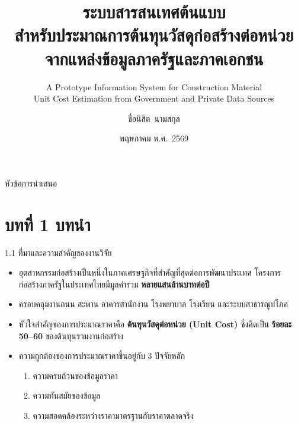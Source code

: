 \documentclass[aspectratio=169,11pt]{beamer}
\title[ระบบประมาณการต้นทุนวัสดุก่อสร้าง]{ระบบสารสนเทศต้นแบบ\\
สำหรับประมาณการต้นทุนวัสดุก่อสร้างต่อหน่วย\\
จากแหล่งข้อมูลภาครัฐและภาคเอกชน}
\subtitle{A Prototype Information System for Construction Material\\
Unit Cost Estimation from Government and Private Data Sources}
\author[ชื่อนิสิต]{ชื่อนิสิต~นามสกุล}
\institute[ภาควิชาวิศวกรรมโยธา จุฬาฯ]{ภาควิชาวิศวกรรมโยธา\\คณะวิศวกรรมศาสตร์ จุฬาลงกรณ์มหาวิทยาลัย}
\date{พฤษภาคม พ.ศ.~2569}
\begin{document}
{
\begin{frame}[plain]
  \titlepage
\end{frame}
}

\begin{frame}[shrink=10]{หัวข้อการนำเสนอ}
  \tableofcontents
\end{frame}

\section{บทที่ 1 บทนำ}

\begin{frame}{1.1 ที่มาและความสำคัญของงานวิจัย}
  \begin{itemize}
    \item อุตสาหกรรมก่อสร้างเป็นหนึ่งในภาคเศรษฐกิจที่สำคัญที่สุดต่อการพัฒนาประเทศ
          โครงการก่อสร้างภาครัฐในประเทศไทยมีมูลค่ารวม \textbf{หลายแสนล้านบาทต่อปี}
    \item ครอบคลุมงานถนน สะพาน อาคารสำนักงาน โรงพยาบาล โรงเรียน และระบบสาธารณูปโภค
    \item หัวใจสำคัญของการประมาณราคาคือ \textbf{ต้นทุนวัสดุต่อหน่วย (Unit Cost)}
          ซึ่งคิดเป็น \textbf{ร้อยละ 50--60} ของต้นทุนรวมงานก่อสร้าง
    \item ความถูกต้องของการประมาณราคาขึ้นอยู่กับ 3 ปัจจัยหลัก
          \begin{enumerate}
            \item ความครบถ้วนของข้อมูลราคา
            \item ความทันสมัยของข้อมูล
            \item ความสอดคล้องระหว่างราคามาตรฐานกับราคาตลาดจริง
          \end{enumerate}
  \end{itemize}
\end{frame}
\end{document}
